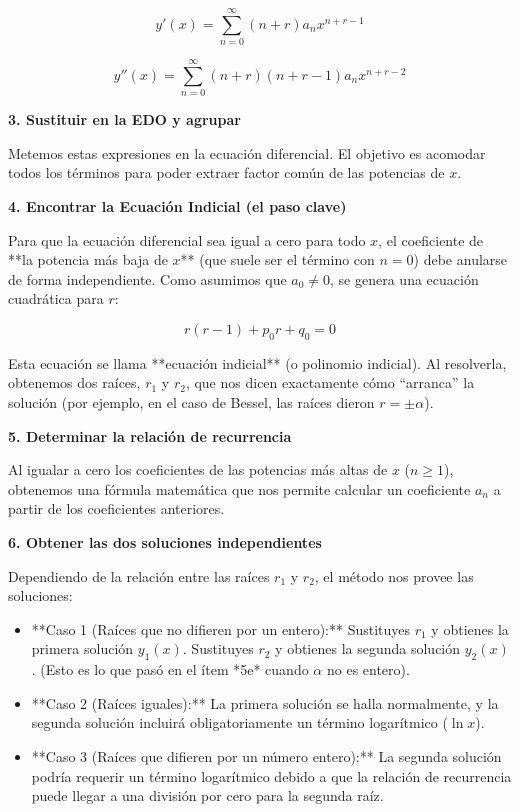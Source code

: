 \documentclass[11pt,spanish]{article}
\begin{document}
$$y'(x) = \sum_{n=0}^{\infty} (n+r) a_n x^{n+r-1}$$

$$y''(x) = \sum_{n=0}^{\infty} (n+r)(n+r-1) a_n x^{n+r-2}$$

{\bf 3. Sustituir en la EDO y agrupar}

Metemos estas expresiones en la ecuación diferencial. El objetivo es acomodar todos los términos para poder extraer factor común de las potencias de $x$.

{\bf  4. Encontrar la Ecuación Indicial (el paso clave)}

Para que la ecuación diferencial sea igual a cero para todo $x$, el coeficiente de **la potencia más baja de $x$** (que suele ser el término con $n=0$) debe anularse de forma independiente. Como asumimos que $a_0 \neq 0$, se genera una ecuación cuadrática para $r$:


$$r(r-1) + p_0 r + q_0 = 0$$


Esta ecuación se llama **ecuación indicial** (o polinomio indicial). Al resolverla, obtenemos dos raíces, $r_1$ y $r_2$, que nos dicen exactamente cómo ``arranca'' la solución (por ejemplo, en el caso de Bessel, las raíces dieron $r = \pm\alpha$).

{\bf 5. Determinar la relación de recurrencia}

Al igualar a cero los coeficientes de las potencias más altas de $x$ ($n \ge 1$), obtenemos una fórmula matemática que nos permite calcular un coeficiente $a_n$ a partir de los coeficientes anteriores.

{\bf  6. Obtener las dos soluciones independientes}

Dependiendo de la relación entre las raíces $r_1$ y $r_2$, el método nos provee las soluciones:
\begin{itemize}
\item **Caso 1 (Raíces que no difieren por un entero):** Sustituyes $r_1$ y obtienes la primera solución $y_1(x)$. Sustituyes $r_2$ y obtienes la segunda solución $y_2(x)$. (Esto es lo que pasó en el ítem *5e* cuando $\alpha$ no es entero).
\item **Caso 2 (Raíces iguales):** La primera solución se halla normalmente, y la segunda solución incluirá obligatoriamente un término logarítmico ($\ln x$).
\item **Caso 3 (Raíces que difieren por un número entero):** La segunda solución podría requerir un término logarítmico debido a que la relación de recurrencia puede llegar a una división por cero para la segunda raíz.
\end{itemize}
\end{document}
